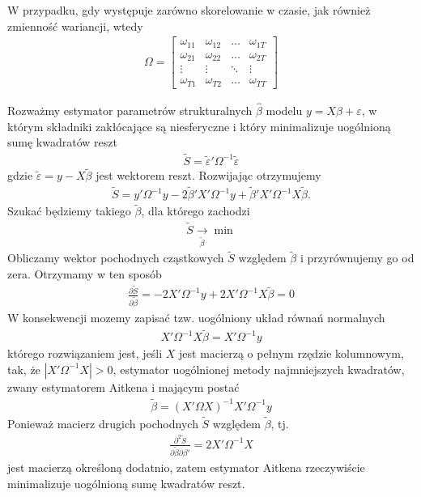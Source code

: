 W przypadku, gdy występuje zarówno skorelowanie w czasie, jak również zmienność wariancji, wtedy
\begin{gather*}
\Omega=\begin{bmatrix}
	\omega _{11} & \omega _{12} & \ldots & \omega _{1T} \\
	\omega _{21} & \omega _{22} & \ldots & \omega _{2T} \\
	\vdots       & \vdots       & \ddots & \vdots       \\
	\omega _{T1} & \omega _{T2} & \ldots & \omega _{TT}
\end{bmatrix}
\end{gather*}

Rozważmy estymator parametrów strukturalnych $ \hat{\beta} $ modelu $ y=X\beta+\varepsilon $, w którym składniki zakłócające są niesferyczne i który minimalizuje uogólnioną sumę kwadratów reszt
\begin{gather*}
\tilde S=\tilde \varepsilon'\Omega^{-1}\tilde \varepsilon
\end{gather*}
gdzie $ \tilde \varepsilon=y-X\tilde \beta $ jest wektorem reszt. Rozwijając otrzymujemy
\begin{gather*}
\tilde S=y'\Omega^{-1}y-2\tilde \beta'X'\Omega^{-1}y+\tilde \beta'X'\Omega^{-1}X\tilde \beta.
\end{gather*}
Szukać będziemy takiego $ \tilde \beta $, dla którego zachodzi
\begin{gather*}
\tilde S\underset{\tilde \beta}{\to} \min
\end{gather*}
Obliczamy wektor pochodnych cząstkowych $ \tilde S $ względem $ \tilde \beta $ i przyrównujemy go od zera. Otrzymamy w ten sposób
\begin{gather*}
\frac{\partial \tilde S}{\partial \tilde \beta}=-2X'\Omega^{-1}y+2X'\Omega^{-1}X\tilde \beta =0
\end{gather*}
W konsekwencji mozemy zapisać tzw. uogólniony układ równań normalnych
\begin{gather*}
X'\Omega^{-1}X\tilde \beta=X'\Omega^{-1}y
\end{gather*}
którego rozwiązaniem jest, jeśli $ X $ jest macierzą o pełnym rzędzie kolumnowym, tak, że $ \left|X'\Omega^{-1}X\right|>0 $, estymator uogólnionej metody najmniejszych kwadratów, zwany estymatorem Aitkena i mającym postać
\begin{gather*}
\tilde \beta=\left(X'\Omega X\right)^{-1}X'\Omega^{-1}y
\end{gather*}
Ponieważ macierz drugich pochodnych $ \tilde S $ względem $ \tilde \beta  $, tj.
\begin{gather*}
\frac{\partial ^2\tilde S}{\partial \tilde \beta \partial \beta'}=2X'\Omega^{-1}X
\end{gather*}
jest macierzą określoną dodatnio, zatem estymator Aitkena rzeczywiście minimalizuje uogólnioną sumę kwadratów reszt.


